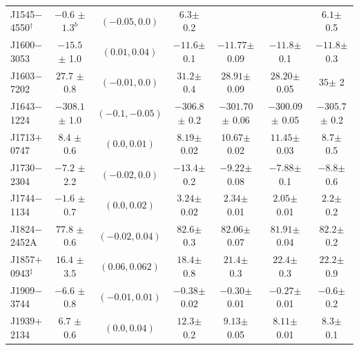 \begin{landscape}
\begin{table}
\begin{tabular}{lcccccc}
J1545$-$4550$^\dagger$  & $-0.6  $ $\pm$ $1.3^b$  &  $(-0.05, 0.0)   $ & $6.3    $$\pm$ 0.2   &                       &                        &  $6.1    $$\pm$ 0.5    \\
J1600$-$3053            & $-15.5 $ $\pm$ 1.0      &  $(0.01, 0.04)   $ & $-11.6  $$\pm$ 0.1   & $-11.77  $$\pm$ 0.09  &  $-11.8   $$\pm$ 0.1   &  $-11.8  $$\pm$ 0.3    \\  
J1603$-$7202            & $27.7  $ $\pm$ 0.8      &  $(-0.01, 0.0)   $ & $31.2   $$\pm$ 0.4   & $28.91   $$\pm$ 0.09  &  $28.20   $$\pm$ 0.05  &  $35     $$\pm$ 2    \\  
J1643$-$1224            & $-308.1$ $\pm$ 1.0      &  $(-0.1, -0.05)  $ & $-306.8 $$\pm$ 0.2   & $-301.70 $$\pm$ 0.06  &  $-300.09 $$\pm$ 0.05  &  $-305.7 $$\pm$ 0.2    \\   
J1713$+$0747            & $8.4   $ $\pm$ 0.6      &  $(0.0, 0.01)    $ & $8.19   $$\pm$ 0.02  & $10.67   $$\pm$ 0.02  &  $11.45   $$\pm$ 0.03  &  $8.7    $$\pm$ 0.5    \\  
J1730$-$2304            & $-7.2  $ $\pm$ 2.2      &  $(-0.02, 0.0)   $ & $-13.4  $$\pm$ 0.2   & $-9.22   $$\pm$ 0.08  &  $-7.88   $$\pm$ 0.1   &  $-8.8   $$\pm$ 0.6    \\  
J1744$-$1134            & $-1.6  $ $\pm$ 0.7      &  $(0.0, 0.02)    $ & $3.24   $$\pm$ 0.02  & $2.34    $$\pm$ 0.01  &  $2.05    $$\pm$ 0.01  &  $2.2    $$\pm$ 0.2    \\  
J1824$-$2452A           & $77.8  $ $\pm$ 0.6      &  $(-0.02, 0.04)  $ & $82.6   $$\pm$ 0.3   & $82.06   $$\pm$ 0.07  &  $81.91   $$\pm$ 0.04  &  $82.2   $$\pm$ 0.2    \\  
J1857$+$0943$^\ddagger$ & $16.4  $ $\pm$ 3.5      &  $(0.06, 0.062)  $ & $18.4   $$\pm$ 0.8   & $21.4    $$\pm$ 0.3   &  $22.4    $$\pm$ 0.3   &  $22.2   $$\pm$ 0.9    \\  
J1909$-$3744            & $-6.6  $ $\pm$ 0.8      &  $(-0.01, 0.01)  $ & $-0.38  $$\pm$ 0.02  & $-0.30   $$\pm$ 0.01  &  $-0.27   $$\pm$ 0.01  &  $-0.6   $$\pm$ 0.2    \\  
J1939$+$2134            & $6.7   $ $\pm$ 0.6      &  $(0.0, 0.04)    $ & $12.3   $$\pm$ 0.2   & $9.13    $$\pm$ 0.05  &  $8.11    $$\pm$ 0.01  &  $8.3    $$\pm$ 0.1    \\  

\end{tabular}
\end{table}
\end{landscape}
